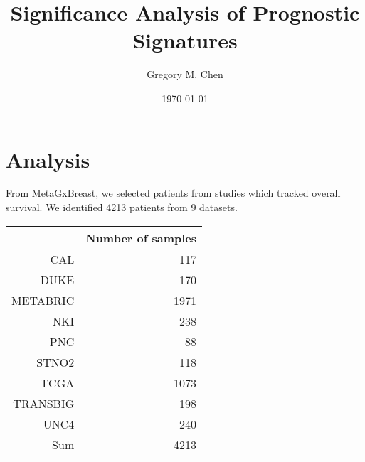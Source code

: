 \documentclass{article}\usepackage[]{graphicx}\usepackage[]{color}
\begin{document}
\title{Significance Analysis of Prognostic Signatures}

\author{Gregory M. Chen}
\date{\today}
\maketitle






\tableofcontents
\pagebreak
\section{Analysis}

From MetaGxBreast, we selected patients from studies which tracked overall survival. We identified 4213 patients from 9 datasets.
\begin{table}[ht]
\centering
\begin{tabular}{rr}
  \hline
 & Number of samples \\ 
  \hline
CAL & 117 \\ 
  DUKE & 170 \\ 
  METABRIC & 1971 \\ 
  NKI & 238 \\ 
  PNC &  88 \\ 
  STNO2 & 118 \\ 
  TCGA & 1073 \\ 
  TRANSBIG & 198 \\ 
  UNC4 & 240 \\ 
  Sum & 4213 \\ 
   \hline
\end{tabular}
\end{table}
\end{document}
